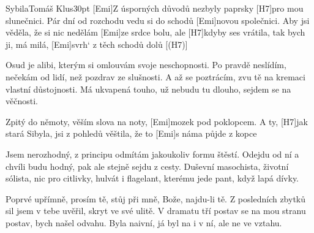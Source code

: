 \begin{song}{Sybila}{Tomáš Klus}{30pt}
%
[Emi]Z úsporných důvodů nezbyly paprsky [H7]pro mou slunečnici.
Pár dní od rozchodu vedu si do schodů [Emi]novou společnici.
\rl [Ami]Aby jsi věděla, že si nic nedělám [Emi]ze srdce bolu,
ale [H7]kdyby ses vrátila, tak bych ji, má milá, [Emi]svrh‘ z těch schodů dolů\rr{} [(H7)]{}

%
Osud je alibi, kterým si omlouvám svoje neschopnosti.
Po pravdě neslídím, nečekám od lidí, než pozdrav ze slušnosti.
A až se poztrácím, zvu tě na kremaci vlastní důstojnosti.
Má ukvapená touho, už nebudu tu dlouho, sejdem se na věčnosti.

\chorus%
\rl [Ami]Zpitý do němoty, věším slova na noty, [Emi]mozek pod poklopcem.
A ty, [H7]jak stará Sibyla, jsi z pohledů věštila, že to [Emi]s náma půjde z kopce\rr{}

%
Jsem nerozhodný, z principu odmítám jakoukoliv formu štěstí.
Odejdu od ní a chvíli budu hodný, pak ale stejně sejdu z cesty.
Duševní masochista, životní sólista, nic pro citlivky,
hulvát i flagelant, kterému jede pant, když lapá dívky.
\repchor
 
%
Poprvé upřímně, prosím tě, stůj při mně, Bože, najdu-li tě.
Z posledních zbytků sil jsem v tebe uvěřil, skryt ve své ulitě.
V dramatu tří postav se na mou stranu postav, bych našel odvahu.
Byla naivní, já byl na i v ní, ale ne ve vztahu.
\repchor
\end{song}
